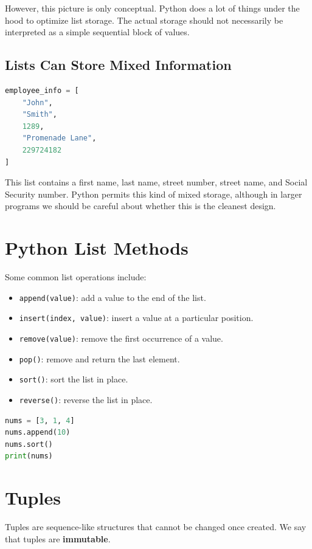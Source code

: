 \documentclass[11pt]{article}
\begin{document}
However, this picture is only conceptual. Python does a lot of things under the hood to optimize list storage. The actual storage should not necessarily be interpreted as a simple sequential block of values.

\subsection{Lists Can Store Mixed Information}

\begin{lstlisting}[language=Python]
employee_info = [
    "John",
    "Smith",
    1289,
    "Promenade Lane",
    229724182
]
\end{lstlisting}

This list contains a first name, last name, street number, street name, and Social Security number. Python permits this kind of mixed storage, although in larger programs we should be careful about whether this is the cleanest design.

\section{Python List Methods}

Some common list operations include:

\begin{itemize}
    \item \texttt{append(value)}: add a value to the end of the list.
    \item \texttt{insert(index, value)}: insert a value at a particular position.
    \item \texttt{remove(value)}: remove the first occurrence of a value.
    \item \texttt{pop()}: remove and return the last element.
    \item \texttt{sort()}: sort the list in place.
    \item \texttt{reverse()}: reverse the list in place.
\end{itemize}

\begin{lstlisting}[language=Python]
nums = [3, 1, 4]
nums.append(10)
nums.sort()
print(nums)
\end{lstlisting}

\section{Tuples}

Tuples are sequence-like structures that cannot be changed once created. We say that tuples are \textbf{immutable}.
\end{document}
